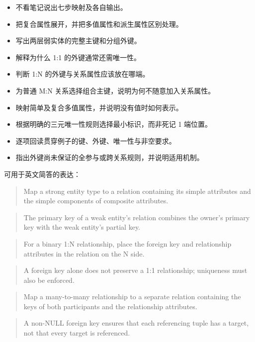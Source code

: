 \begin{itemize}
\tightlist
\item[$\square$]
  不看笔记说出七步映射及各自输出。
\item[$\square$]
  把复合属性展开，并把多值属性和派生属性区别处理。
\item[$\square$]
  写出两层弱实体的完整主键和分组外键。
\item[$\square$]
  解释为什么 1:1 的外键通常还需唯一性。
\item[$\square$]
  判断 1:N 的外键与关系属性应该放在哪端。
\item[$\square$]
  为普通 M:N 关系选择组合主键，说明为何不随意加入关系属性。
\item[$\square$]
  映射简单及复合多值属性，并说明没有值时如何表示。
\item[$\square$]
  根据明确的三元唯一性规则选择最小标识，而非死记 1 端位置。
\item[$\square$]
  逐项回读贯穿例子的键、外键、唯一性与非空要求。
\item[$\square$]
  指出外键尚未保证的全参与或跨关系规则，并说明适用机制。
\end{itemize}

可用于英文简答的表达：

\begin{quote}
Map a strong entity type to a relation containing its simple attributes and the simple components of composite attributes.
\end{quote}

\begin{quote}
The primary key of a weak entity's relation combines the owner's primary key with the weak entity's partial key.
\end{quote}

\begin{quote}
For a binary 1:N relationship, place the foreign key and relationship attributes in the relation on the N side.
\end{quote}

\begin{quote}
A foreign key alone does not preserve a 1:1 relationship; uniqueness must also be enforced.
\end{quote}

\begin{quote}
Map a many-to-many relationship to a separate relation containing the keys of both participants and the relationship attributes.
\end{quote}

\begin{quote}
A non-NULL foreign key ensures that each referencing tuple has a target, not that every target is referenced.
\end{quote}

